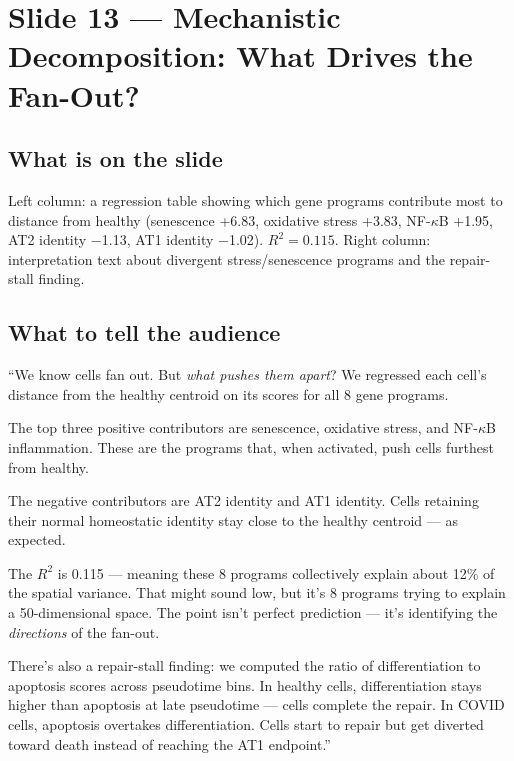 \documentclass[11pt]{article}
\begin{document}
\section{Slide 13 --- Mechanistic Decomposition: What Drives the Fan-Out?}

\subsection{What is on the slide}

Left column: a regression table showing which gene programs contribute most to distance from healthy (senescence +6.83, oxidative stress +3.83, NF-$\kappa$B +1.95, AT2 identity $-$1.13, AT1 identity $-$1.02). $R^2 = 0.115$. Right column: interpretation text about divergent stress/senescence programs and the repair-stall finding.

\subsection{What to tell the audience}

\begin{speaknote}
``We know cells fan out. But \emph{what pushes them apart}? We regressed each cell's distance from the healthy centroid on its scores for all 8 gene programs.

The top three positive contributors are senescence, oxidative stress, and NF-$\kappa$B inflammation. These are the programs that, when activated, push cells furthest from healthy.

The negative contributors are AT2 identity and AT1 identity. Cells retaining their normal homeostatic identity stay close to the healthy centroid --- as expected.

The $R^2$ is 0.115 --- meaning these 8 programs collectively explain about 12\% of the spatial variance. That might sound low, but it's 8 programs trying to explain a 50-dimensional space. The point isn't perfect prediction --- it's identifying the \emph{directions} of the fan-out.

There's also a repair-stall finding: we computed the ratio of differentiation to apoptosis scores across pseudotime bins. In healthy cells, differentiation stays higher than apoptosis at late pseudotime --- cells complete the repair. In COVID cells, apoptosis overtakes differentiation. Cells start to repair but get diverted toward death instead of reaching the AT1 endpoint.''
\end{speaknote}
\end{document}
